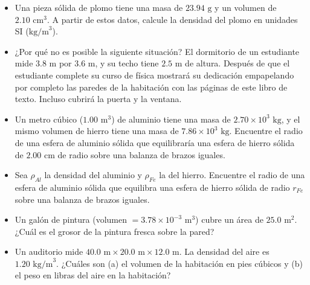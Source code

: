 \documentclass[11pt,a4paper]{article}
\begin{document}
\begin{itemize}
    \item[\textbf{11.}] Una pieza sólida de plomo tiene una masa de $23.94 \text{ g}$ y un volumen de $2.10 \text{ cm}^3$. A partir de estos datos, calcule la densidad del plomo en unidades SI ($\text{kg/m}^3$).
    \vspace*{5cm}
    
    \item[\textbf{12.}] ¿Por qué no es posible la siguiente situación? El dormitorio de un estudiante mide $3.8 \text{ m}$ por $3.6 \text{ m}$, y su techo tiene $2.5 \text{ m}$ de altura. Después de que el estudiante complete su curso de física mostrará su dedicación empapelando por completo las paredes de la habitación con las páginas de este libro de texto. Incluso cubrirá la puerta y la ventana.
    \vspace*{7cm}
    
    \item[\textbf{13.}] Un metro cúbico ($1.00 \text{ m}^3$) de aluminio tiene una masa de $2.70 \times 10^3 \text{ kg}$, y el mismo volumen de hierro tiene una masa de $7.86 \times 10^3 \text{ kg}$. Encuentre el radio de una esfera de aluminio sólida que equilibraría una esfera de hierro sólida de $2.00 \text{ cm}$ de radio sobre una balanza de brazos iguales.
    \vspace*{6cm}
    
    \item[\textbf{14.}] Sea $\rho_{Al}$ la densidad del aluminio y $\rho_{Fe}$ la del hierro. Encuentre el radio de una esfera de aluminio sólida que equilibra una esfera de hierro sólida de radio $r_{Fe}$ sobre una balanza de brazos iguales.
    \vspace*{4cm}
    
    \item[\textbf{15.}] Un galón de pintura (volumen $= 3.78 \times 10^{-3} \text{ m}^3$) cubre un área de $25.0 \text{ m}^2$. ¿Cuál es el grosor de la pintura fresca sobre la pared?
    \vspace*{5cm}
    
    \item[\textbf{16.}] Un auditorio mide $40.0 \text{ m} \times 20.0 \text{ m} \times 12.0 \text{ m}$. La densidad del aire es $1.20 \text{ kg/m}^3$. ¿Cuáles son (a) el volumen de la habitación en pies cúbicos y (b) el peso en libras del aire en la habitación?
    \vspace*{7cm}
\end{itemize}
\end{document}
